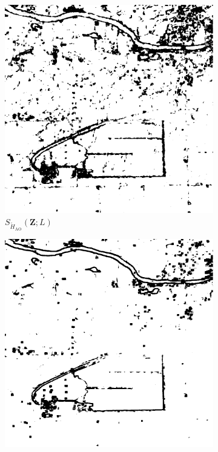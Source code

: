 \begin{figure}[H]
  \centering
  \begin{subfigure}[b]{0.3\textwidth}
    \centering
    \includegraphics[width=\textwidth]{../../Figures/PNG/H_005_pvalues_Illinois_1024_36L_AO_200b}
    \caption{$S_{\widetilde{H}_{\text{AO}}}(\bm{Z}; L)$}
    \label{fig:Illinois_crops_0.05-1}
  \end{subfigure}
  \hfill
  \begin{subfigure}[b]{0.3\textwidth}
    \centering
    \includegraphics[width=\textwidth]{../../Figures/PNG/cv_005_pvalues_Illinois_crops_1024}

\end{subfigure}
\end{figure}
